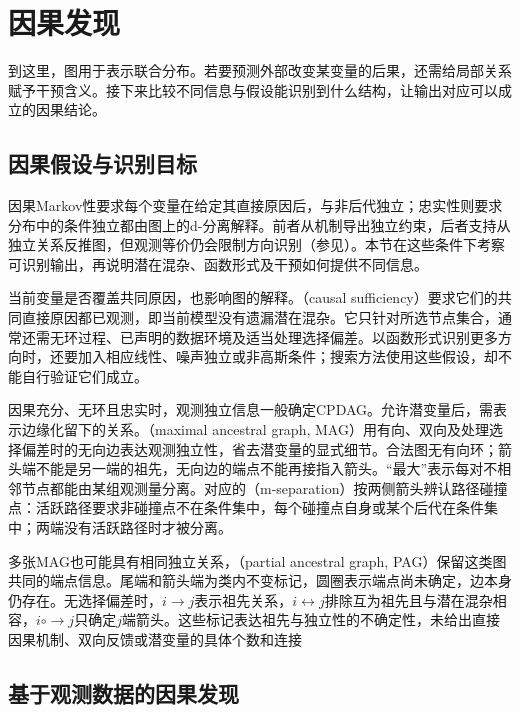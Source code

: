 \section{因果发现}
\label{sec:pgm-structure-learning-causal}

到这里，图用于表示联合分布。若要预测外部改变某变量的后果，还需给局部关系赋予干预含义。接下来比较不同信息与假设能识别到什么结构，让输出对应可以成立的因果结论。

\subsection{因果假设与识别目标}
\label{sec:pgm-structure-learning-causal-assumptions}

因果Markov性要求每个变量在给定其直接原因后，与非后代独立；忠实性则要求分布中的条件独立都由图上的d-分离解释。前者从机制导出独立约束，后者支持从独立关系反推图，但观测等价仍会限制方向识别（参见）。本节在这些条件下考察可识别输出，再说明潜在混杂、函数形式及干预如何提供不同信息。

当前变量是否覆盖共同原因，也影响图的解释。（causal sufficiency）要求它们的共同直接原因都已观测，即当前模型没有遗漏潜在混杂。它只针对所选节点集合，通常还需无环过程、已声明的数据环境及适当处理选择偏差。以函数形式识别更多方向时，还要加入相应线性、噪声独立或非高斯条件；搜索方法使用这些假设，却不能自行验证它们成立。

因果充分、无环且忠实时，观测独立信息一般确定CPDAG。允许潜变量后，需表示边缘化留下的关系。（maximal ancestral graph, MAG）用有向、双向及处理选择偏差时的无向边表达观测独立性，省去潜变量的显式细节。合法图无有向环；箭头端不能是另一端的祖先，无向边的端点不能再接指入箭头。“最大”表示每对不相邻节点都能由某组观测量分离。对应的（m-separation）按两侧箭头辨认路径碰撞点：活跃路径要求非碰撞点不在条件集中，每个碰撞点自身或某个后代在条件集中；两端没有活跃路径时才被分离。

多张MAG也可能具有相同独立关系，（partial ancestral graph, PAG）保留这类图共同的端点信息。尾端和箭头端为类内不变标记，圆圈表示端点尚未确定，边本身仍存在。无选择偏差时，$i\to j$表示祖先关系，$i\leftrightarrow j$排除互为祖先且与潜在混杂相容，$i\mathbin{\circ\!\!\to}j$只确定$j$端箭头。这些标记表达祖先与独立性的不确定性，未给出直接因果机制、双向反馈或潜变量的具体个数和连接

\subsection{基于观测数据的因果发现}
\label{sec:pgm-structure-learning-observational}

